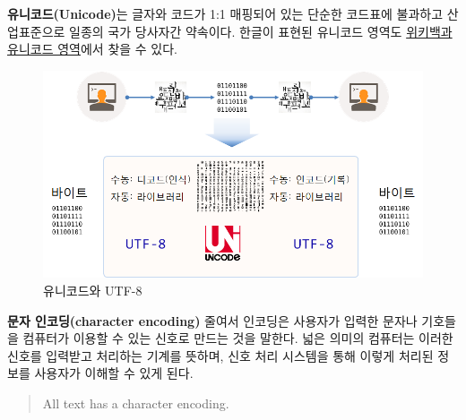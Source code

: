 \documentclass[
  letterpaper,
]{book}
\begin{document}
\textbf{유니코드(Unicode)}는 글자와 코드가 1:1 매핑되어 있는 단순한
코드표에 불과하고 산업표준으로 일종의 국가 당사자간 약속이다. 한글이
표현된 유니코드 영역도
\href{https://ko.wikipedia.org/wiki/\%EC\%9C\%A0\%EB\%8B\%88\%EC\%BD\%94\%EB\%93\%9C_\%EC\%98\%81\%EC\%97\%AD}{위키백과
유니코드 영역}에서 찾을 수 있다.

\begin{figure}

{\centering \includegraphics{images/auth-unicode-utf-8.png}

}

\caption{유니코드와 UTF-8}

\end{figure}

\begin{tcolorbox}[enhanced jigsaw, opacityback=0, opacitybacktitle=0.6, colback=white, rightrule=.15mm, coltitle=black, colframe=quarto-callout-note-color-frame, colbacktitle=quarto-callout-note-color!10!white, bottomrule=.15mm, bottomtitle=1mm, breakable, title=\textcolor{quarto-callout-note-color}{\faInfo}\hspace{0.5em}{인코딩 (Encoding)}, titlerule=0mm, leftrule=.75mm, toptitle=1mm, left=2mm, arc=.35mm, toprule=.15mm]

\textbf{문자 인코딩(character encoding)} 줄여서 인코딩은 사용자가 입력한
문자나 기호들을 컴퓨터가 이용할 수 있는 신호로 만드는 것을 말한다. 넓은
의미의 컴퓨터는 이러한 신호를 입력받고 처리하는 기계를 뜻하며, 신호 처리
시스템을 통해 이렇게 처리된 정보를 사용자가 이해할 수 있게 된다.

\begin{quote}
All text has a character encoding.
\end{quote}

\end{tcolorbox}
\end{document}
